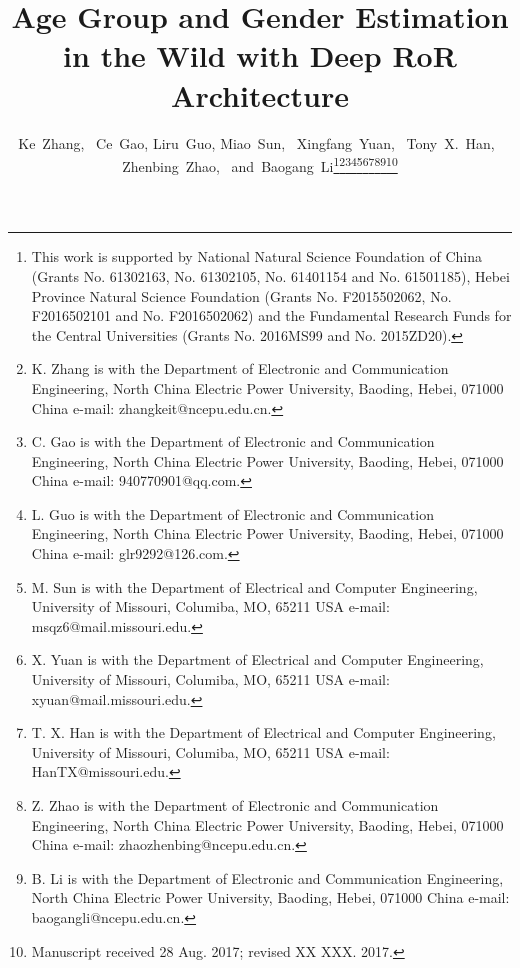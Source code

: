 \documentclass[journal]{IEEEtran}
\begin{document}
\title{Age Group and Gender Estimation in the Wild with Deep RoR Architecture}


\author{Ke~Zhang,~
        Ce~Gao,
        Liru~Guo,
        Miao~Sun,~
        Xingfang~Yuan,~
        Tony~X.~Han,~
        Zhenbing~Zhao,~
        and~Baogang~Li\thanks{This work is supported by National Natural Science Foundation of China (Grants No. 61302163, No. 61302105, No. 61401154 and No. 61501185), Hebei Province Natural Science Foundation (Grants No. F2015502062, No. F2016502101 and No. F2016502062) and the Fundamental Research Funds for the Central Universities (Grants No. 2016MS99 and No. 2015ZD20).}\thanks{K. Zhang is with the Department
of Electronic and Communication Engineering, North China Electric Power University, Baoding,
Hebei, 071000 China e-mail: zhangkeit@ncepu.edu.cn.}\thanks{C. Gao is with the Department
  of Electronic and Communication Engineering, North China Electric Power University, Baoding,
  Hebei, 071000 China e-mail: 940770901@qq.com.}\thanks{L. Guo is with the Department
  of Electronic and Communication Engineering, North China Electric Power University, Baoding,
  Hebei, 071000 China e-mail: glr9292@126.com.}\thanks{M. Sun is with the Department
	of Electrical and Computer Engineering, University of Missouri, Columiba,
	MO, 65211 USA e-mail: msqz6@mail.missouri.edu.}\thanks{X. Yuan is with the Department
	of Electrical and Computer Engineering, University of Missouri, Columiba,
	MO, 65211 USA e-mail: xyuan@mail.missouri.edu.}\thanks{T. X. Han is with the Department
  of Electrical and Computer Engineering, University of Missouri, Columiba,
  MO, 65211 USA e-mail: HanTX@missouri.edu.}\thanks{Z. Zhao is with the Department
	of Electronic and Communication Engineering, North China Electric Power University, Baoding,
	Hebei, 071000 China e-mail: zhaozhenbing@ncepu.edu.cn.}\thanks{B. Li is with the Department
  of Electronic and Communication Engineering, North China Electric Power University, Baoding,
  Hebei, 071000 China e-mail: baogangli@ncepu.edu.cn.}\thanks{Manuscript received 28 Aug. 2017; revised XX XXX. 2017.}}





\end{document}
